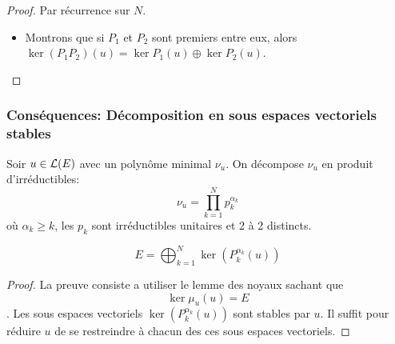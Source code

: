 \begin{proof}
	Par récurrence sur $N$.

	\begin{itemize}
		\item Montrons que si $P_1$ et $P_2$ sont premiers entre eux, alors $\ker (P_1P_2) (u) = \ker P_1(u) \oplus \ker P_2(u)$.\\
	\end{itemize}
\end{proof}


\subsubsection{Conséquences: Décomposition en sous espaces vectoriels stables}


Soir $u \in \mathcal{L}(E)$ avec un polynôme minimal $\nu_u$. On décompose $\nu_u$ en produit
d'irréductibles:
$$ \nu_u = \prod\limits_{k=1}^N p_k^{\alpha_k} $$
où $\alpha_k \geq k$, les $p_k$ sont irréductibles unitaires et 2 à 2 distincts.


\begin{coro}
	$$E = \bigoplus_{k=1}^N \ker\left( {P_k^{\alpha_k}(u)} \right)$$
\end{coro}

\begin{proof}
	La preuve consiste a utiliser le lemme des noyaux sachant que
	$$\ker \mu_u(u) = E $$
	. Les sous espaces vectoriels  $\ker\left( {P_k^{\alpha_k}(u)} \right)$ sont stables par $u$.
	Il suffit pour réduire $u$ de se restreindre à chacun des ces sous espaces vectoriels.
\end{proof}

